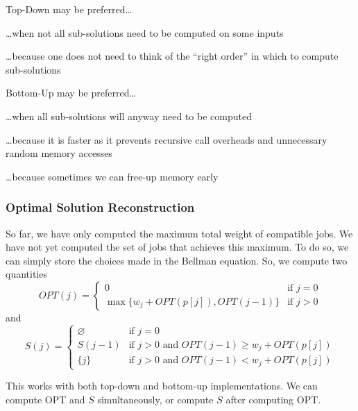 \begin{listu}
    \item Top-Down may be preferred\dots
    \begin{listu}
        \item {\dots}when not all sub-solutions need to be computed on some inputs
        \item {\dots}because one does not need to think of the ``right order'' in which to compute sub-solutions
    \end{listu}

    \item Bottom-Up may be preferred\dots
    \begin{listu}
        \item {\dots}when all sub-solutions will anyway need to be computed
        \item {\dots}because it is faster as it prevents recursive call overheads and unnecessary random memory accesses
        \item {\dots}because sometimes we can free-up memory early
    \end{listu}
\end{listu}

\subsubsection{Optimal Solution Reconstruction}

So far, we have only computed the maximum total weight of compatible jobs. We have not yet computed the set of jobs that achieves this maximum. To do so, we can simply store the choices made in the Bellman equation. So, we compute two quantities \[
    OPT(j) = \begin{cases}
        0                                   & \text{if } j = 0 \\
        \max\{w_j + OPT(p[j]), OPT(j - 1)\} & \text{if } j > 0
    \end{cases}
\] and \[
    S(j) = \begin{cases}
        \varnothing & \text{if } j = 0                                             \\
        S(j - 1)    & \text{if } j > 0 \text{ and } OPT(j - 1) \ge w_j + OPT(p[j]) \\
        \{j\}       & \text{if } j > 0 \text{ and } OPT(j - 1) < w_j + OPT(p[j])
    \end{cases}
\]

This works with both top-down and bottom-up implementations. We can compute OPT and $S$ simultaneously, or compute $S$ after computing OPT. 

